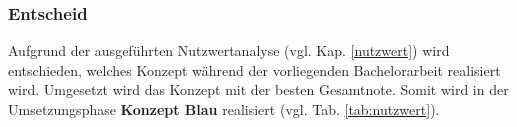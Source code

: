 \subsubsection{Entscheid}
Aufgrund der ausgeführten Nutzwertanalyse (vgl. Kap. \ref{nutzwert}) wird entschieden, welches Konzept während der vorliegenden Bachelorarbeit realisiert wird. Umgesetzt wird das Konzept mit der besten Gesamtnote. Somit wird in der Umsetzungsphase \textbf{Konzept Blau} realisiert (vgl. Tab. \ref{tab:nutzwert}).